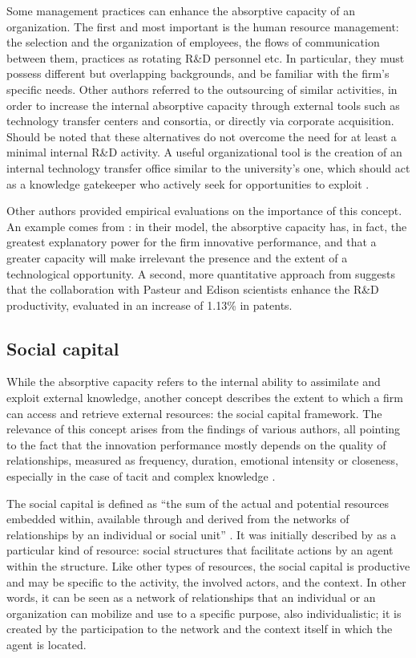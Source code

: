 Some management practices can enhance the absorptive capacity of an organization. The first and most important is the human resource management: the selection and the organization of employees, the flows of communication between them, practices as rotating R\&D personnel etc. In particular, they must possess different but overlapping backgrounds, and be familiar with the firm's specific needs. Other authors referred to the outsourcing of similar activities, in order to increase the internal absorptive capacity through external tools such as technology transfer centers and consortia, or directly via corporate acquisition. Should be noted that these alternatives do not overcome the need for at least a minimal internal R\&D activity. A useful organizational tool is the creation of an internal technology transfer office similar to the university's one, which should act as a knowledge gatekeeper who actively seek for opportunities to exploit \citep{Alexander2013}.

Other authors provided empirical evaluations on the importance of this concept. An example comes from \citet{Nieto2005}: in their model, the absorptive capacity has, in fact, the greatest explanatory power for the firm innovative performance, and that a greater capacity will make irrelevant the presence and the extent of a technological opportunity. A second, more quantitative approach from \citet{Baba2009} suggests that the collaboration with Pasteur and Edison scientists enhance the R\&D productivity, evaluated in an increase of 1.13\% in patents.

\subsection{Social capital}

While the absorptive capacity refers to the internal ability to assimilate and exploit external knowledge, another concept describes the extent to which a firm can access and retrieve external resources: the social capital framework. The relevance of this concept arises from the findings of various authors, all pointing to the fact that the innovation performance mostly depends on the quality of relationships, measured as frequency, duration, emotional intensity or closeness, especially in the case of tacit and complex knowledge \citep{Perez-Luno2011}. 

The social capital is defined as \enquote{the sum of the actual and potential resources embedded within, available through and derived from the networks of relationships by an individual or social unit} \citep{Perez-Luno2011}. It was initially described by \citet{Coleman1988} as a particular kind of resource: social structures that facilitate actions by an agent within the structure. Like other types of resources, the social capital is productive and may be specific to the activity, the involved actors, and the context. In other words, it can be seen as a network of relationships that an individual or an organization can mobilize and use to a specific purpose, also individualistic; it is created by the participation to the network and the context itself in which the agent is located.

